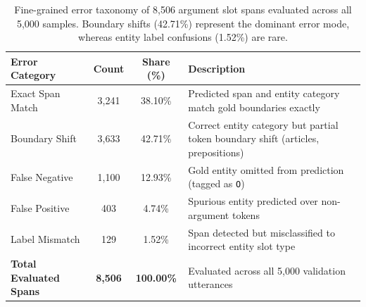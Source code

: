 \begin{table}[t]
\centering
\small
\caption{Fine-grained error taxonomy of 8,506 argument slot spans evaluated across all 5,000 samples. Boundary shifts (42.71\%) represent the dominant error mode, whereas entity label confusions (1.52\%) are rare.}
\label{tab:error_taxonomy}
\begin{tabular}{lccl}
\toprule
\textbf{Error Category} & \textbf{Count} & \textbf{Share (\%)} & \textbf{Description} \\
\midrule
Exact Span Match & 3,241 & 38.10\% & Predicted span and entity category match gold boundaries exactly \\
Boundary Shift & 3,633 & 42.71\% & Correct entity category but partial token boundary shift (articles, prepositions) \\
False Negative & 1,100 & 12.93\% & Gold entity omitted from prediction (tagged as \texttt{O}) \\
False Positive & 403 & 4.74\% & Spurious entity predicted over non-argument tokens \\
Label Mismatch & 129 & 1.52\% & Span detected but misclassified to incorrect entity slot type \\
\midrule
\textbf{Total Evaluated Spans} & \textbf{8,506} & \textbf{100.00\%} & Evaluated across all 5,000 validation utterances \\
\bottomrule
\end{tabular}
\end{table}
